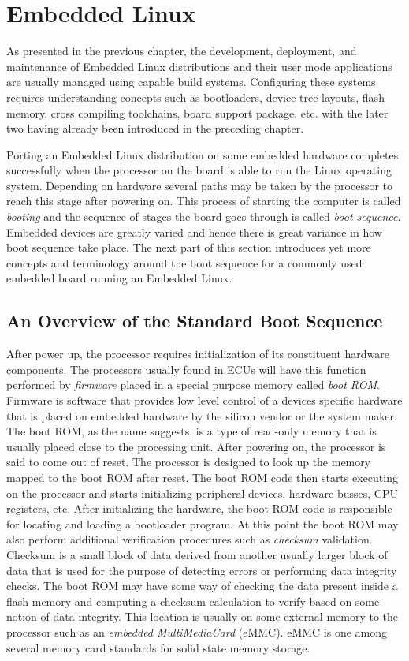 \section{Embedded Linux}

As presented in the previous chapter, the development, deployment, and maintenance of Embedded Linux distributions and their user mode applications are usually managed using capable build systems. Configuring these systems requires understanding concepts such as bootloaders, device tree layouts, flash memory, cross compiling toolchains, board support package, etc. with the later two having already been introduced in the preceding chapter.

Porting an Embedded Linux distribution on some embedded hardware completes successfully when the processor on the board is able to run the Linux operating system. Depending on hardware several paths may be taken by the processor to reach this stage after powering on. This process of starting the computer is called \textit{booting} and the sequence of stages the board goes through is called \textit{boot sequence}. Embedded devices are greatly varied and hence there is great variance in how boot sequence take place. The next part of this section introduces yet more concepts and terminology around the boot sequence for a commonly used embedded board running an Embedded Linux.

\subsection{An Overview of the Standard Boot Sequence}

After power up, the processor requires initialization of its constituent hardware components. The processors usually found in ECUs will have this function performed by \textit{firmware} placed in a special purpose memory called \textit{boot ROM}. Firmware is software that provides low level control of a devices specific hardware that is placed on embedded hardware by the silicon vendor or the system maker. The boot ROM, as the name suggests, is a type of read-only memory that is usually placed close to the processing unit. After powering on, the processor is said to come out of reset. The processor is designed to look up the memory mapped to the boot ROM after reset. The boot ROM code then starts executing on the processor and starts initializing peripheral devices, hardware busses, CPU registers, etc. After initializing the hardware, the boot ROM code is responsible for locating and loading a bootloader program. At this point the boot ROM may also perform additional verification procedures such as \textit{checksum} validation. Checksum is a small block of data derived from another usually larger block of data that is used for the purpose of detecting errors or performing data integrity checks. The boot ROM may have some way of checking the data present inside a flash memory and computing a checksum calculation to verify based on some notion of data integrity. This location is usually on some external memory to the processor such as an \textit{embedded MultiMediaCard} (eMMC). eMMC is one among several memory card standards for solid state memory storage.

